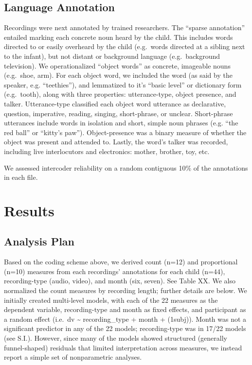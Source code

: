 \documentclass[floatsintext,man]{apa6}
\theoremstyle{definition}
\theoremstyle{definition}
\theoremstyle{definition}
\theoremstyle{remark}
\begin{document}
\subsection{Language Annotation}\label{language-annotation}

Recordings were next annotated by trained researchers. The
\enquote{sparse annotation} entailed marking each concrete noun heard by
the child. This includes words directed to or easily overheard by the
child (e.g.~words directed at a sibling next to the infant), but not
distant or background language (e.g.~background television). We
operationalized \enquote{object words} as concrete, imageable nouns
(e.g.~shoe, arm). For each object word, we included the word (as said by
the speaker, e.g. \enquote{teethies}), and lemmatized to it's
\enquote{basic level} or dictionary form (e.g.~tooth), along with three
properties: utterance-type, object presence, and talker. Utterance-type
classified each object word utterance as declarative, question,
imperative, reading, singing, short-phrase, or unclear. Short-phrase
utterances include words in isolation and short, simple noun phrases
(e.g. \enquote{the red ball} or \enquote{kitty's paw}). Object-presence
was a binary measure of whether the object was present and attended to.
Lastly, the word's talker was recorded, including live interlocutors and
electronics: mother, brother, toy, etc.

We assessed intercoder reliability on a random contiguous 10\% of the
annotations in each file.

\section{Results}\label{results}

\subsection{Analysis Plan}\label{analysis-plan}

Based on the coding scheme above, we derived count (n=12) and
proportional (n=10) measures from each recordings' annotations for each
child (n=44), recording-type (audio, video), and month (six, seven). See
Table XX. We also normalized the count measures by recording length;
further details are below. We initially created multi-level models, with
each of the 22 measures as the dependent variable, recording-type and
month as fixed effects, and participant as a random effect (i.e.~dv
\textasciitilde{} recording\_type + month + (1\textbar{}subj)). Month
was not a significant predictor in any of the 22 models; recording-type
was in 17/22 models (see S.I.). However, since many of the models showed
structured (generally funnel-shaped) residuals that limited
interpretation across measures, we instead report a simple set of
nonparametric analyses.
\end{document}

